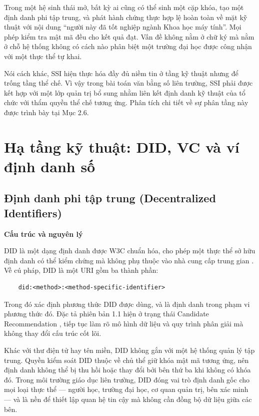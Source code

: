 Trong một hệ sinh thái mở, bất kỳ ai cũng có thể sinh một cặp khóa, tạo một định danh phi tập trung, và phát hành chứng thực hợp lệ hoàn toàn về mặt kỹ thuật với nội dung {``}người này đã tốt nghiệp ngành Khoa học máy tính{''}. Mọi phép kiểm tra mật mã đều cho kết quả đạt. Vấn đề không nằm ở chữ ký mà nằm ở chỗ hệ thống không có cách nào phân biệt một trường đại học được công nhận với một thực thể tự khai.

Nói cách khác, SSI hiện thực hóa đầy đủ niềm tin ở tầng kỹ thuật nhưng để trống tầng thể chế. Vì vậy trong bài toán văn bằng số liên trường, SSI phải được kết hợp với một lớp quản trị bổ sung nhằm liên kết định danh kỹ thuật của tổ chức với thẩm quyền thể chế tương ứng. Phân tích chi tiết về sự phân tầng này được trình bày tại Mục 2.6.

\section{Hạ tầng kỹ thuật: DID, VC và ví định danh số}

\subsection{Định danh phi tập trung (Decentralized Identifiers)}

\noindent \textbf{Cấu trúc và nguyên lý}

DID là một dạng định danh được W3C chuẩn hóa, cho phép một thực thể sở hữu định danh có thể kiểm chứng mà không phụ thuộc vào nhà cung cấp trung gian \cite{W3C_DIDCore2022}. Về cú pháp, DID là một URI gồm ba thành phần:

\begin{lstlisting}
    did:<method>:<method-specific-identifier>
\end{lstlisting}

\begin{sloppypar}
Trong đó  xác định phương thức DID được dùng, và  là định danh trong phạm vi phương thức đó. Đặc tả phiên bản 1.1 hiện ở trạng thái Candidate Recommendation \cite{W3C_DID11_2026}, tiếp tục làm rõ mô hình dữ liệu và quy trình phân giải mà không thay đổi cấu trúc cốt lõi.
\end{sloppypar}

Khác với thư điện tử hay tên miền, DID không gắn với một hệ thống quản lý tập trung. Quyền kiểm soát DID thuộc về chủ thể giữ khóa mật mã tương ứng, nên định danh không thể bị thu hồi hoặc thay đổi bởi bên thứ ba khi không có khóa đó. Trong môi trường giáo dục liên trường, DID đóng vai trò định danh gốc cho mọi loại thực thể --- người học, trường đại học, cơ quan quản trị, bên xác minh --- và là nền để thiết lập quan hệ tin cậy mà không cần đồng bộ dữ liệu giữa các bên.

